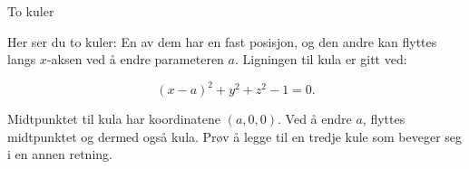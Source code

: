 \documentclass[no]{./../../common/SurferDesc}%
\begin{document}
\footnotesize
%
\begin{surferPage}
  \begin{surferTitle}To kuler\end{surferTitle}
  
   \begin{surferText}   
Her ser du to kuler: En av dem har en fast posisjon, og den andre kan flyttes langs $x$-aksen ved å endre parameteren $a$. 
Ligningen til kula er gitt ved:

\[(x-a)^2+y^2+z^2-1=0.\]


Midtpunktet til kula har koordinatene $(a,0,0)$. Ved å endre $a$, flyttes midtpunktet og dermed 
også kula. Prøv å legge til en tredje kule som beveger seg i en annen retning. 

     \end{surferText}
\end{surferPage}
\end{document}
